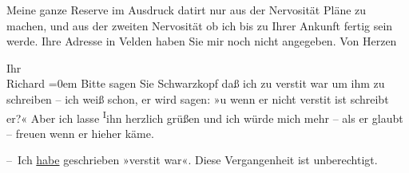\pstart
           Meine ganze Reserve im Ausdruck datirt nur aus der Nervosi{\pb}tät Pläne zu machen, und aus der
                  zweiten\strikeout{,} Nervosität ob ich bis zu Ihrer Ankunft
                  fertig sein werde. Ihre
               Adresse in Velden haben Sie mir noch nicht
               angegeben. Von Herzen\pend
           
\pstart
           Ihr{\\[\baselineskip]}\spacefill\mbox{Richard}\pend
           \leftskip=0em{}
\pstart
           \noindent{}Bitte sagen Sie Schwarzkopf daß ich zu
                     versti{\geminationm}t war um ihm zu schreiben – ich weiß schon,
                  er wird sagen: »u wenn er nicht {\pb}versti{\geminationm}t ist schreibt er?« Aber ich lasse \substVorne{}\textsuperscript{I}\substDazwischen{}i\substHinten{}hn herzlich grüßen und ich würde mich mehr – als er glaubt – freuen wenn
                  er hieher käme.\pend
           
\pstart
           – Ich \uline{habe} geschrieben »versti{\geminationm}t war«. Diese Vergangenheit ist unberechtigt.\pend
           \endnumbering{}  \newcommand{\dateiname}{L00942}\newcommand{\titel}{Richard Beer-Hofmann an Arthur Schnitzler, 14. 7. 1899}\newcommand{\editorInnen}{Martin Anton Müller und Gerd-Hermann Susen}
